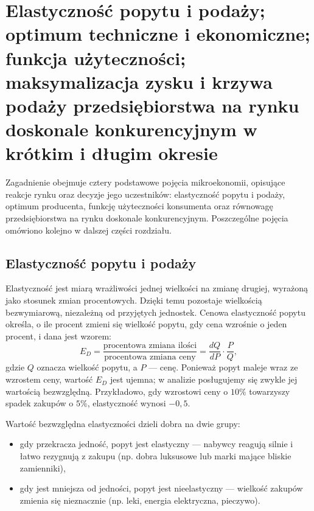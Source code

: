 \section[Elastyczność, optimum producenta, użyteczność, konkurencja doskonała]{Elastyczność popytu i podaży; optimum techniczne i ekonomiczne; funkcja użyteczności; maksymalizacja zysku i krzywa podaży przedsiębiorstwa na rynku doskonale konkurencyjnym w krótkim i długim okresie}

Zagadnienie obejmuje cztery podstawowe pojęcia mikroekonomii, opisujące reakcje rynku oraz decyzje jego uczestników: elastyczność popytu i podaży, optimum producenta, funkcję użyteczności konsumenta oraz równowagę przedsiębiorstwa na rynku doskonale konkurencyjnym. Poszczególne pojęcia omówiono kolejno w dalszej części rozdziału.

\subsection{Elastyczność popytu i podaży}

Elastyczność jest miarą wrażliwości jednej wielkości na zmianę drugiej, wyrażoną jako stosunek zmian procentowych. Dzięki temu pozostaje wielkością bezwymiarową, niezależną od przyjętych jednostek. Cenowa elastyczność popytu określa, o ile procent zmieni się wielkość popytu, gdy cena wzrośnie o jeden procent, i dana jest wzorem:
\begin{equation}
E_D=\frac{\text{procentowa zmiana ilości}}{\text{procentowa zmiana ceny}}=\frac{dQ}{dP}\cdot\frac{P}{Q},
\end{equation}
gdzie $Q$ oznacza wielkość popytu, a $P$ --- cenę. Ponieważ popyt maleje wraz ze wzrostem ceny, wartość $E_D$ jest ujemna; w analizie posługujemy się zwykle jej wartością bezwzględną. Przykładowo, gdy wzrostowi ceny o $10\%$ towarzyszy spadek zakupów o $5\%$, elastyczność wynosi $-0{,}5$.

Wartość bezwzględna elastyczności dzieli dobra na dwie grupy:
\begin{itemize}
  \item gdy przekracza jedność, popyt jest elastyczny --- nabywcy reagują silnie i łatwo rezygnują z zakupu (np. dobra luksusowe lub marki mające bliskie zamienniki),
  \item gdy jest mniejsza od jedności, popyt jest nieelastyczny --- wielkość zakupów zmienia się nieznacznie (np. leki, energia elektryczna, pieczywo).
\end{itemize}

